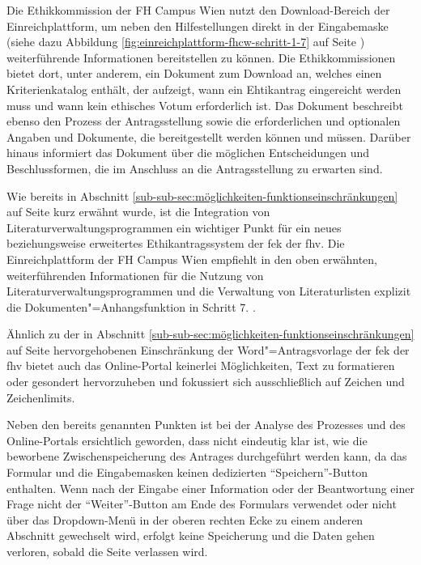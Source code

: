 \documentclass[a4paper,12pt,twoside]{scrreprt}
\begin{document}
Die Ethikkommission der FH Campus Wien nutzt den Download-Bereich der Einreichplattform, um neben den Hilfestellungen direkt in der Eingabemaske (siehe dazu Abbildung \ref{fig:einreichplattform-fhcw-schritt-1-7} auf Seite \pageref{fig:einreichplattform-fhcw-schritt-1-7}) weiterführende Informationen bereitstellen zu können. Die Ethikkommissionen bietet dort, unter anderem, ein Dokument zum Download an, welches einen Kriterienkatalog enthält, der aufzeigt, wann ein Ehtikantrag eingereicht werden muss und wann kein ethisches Votum erforderlich ist. Das Dokument beschreibt ebenso den Prozess der Antragsstellung sowie die erforderlichen und optionalen Angaben und Dokumente, die bereitgestellt werden können und müssen. Darüber hinaus informiert das Dokument über die möglichen Entscheidungen und Beschlussformen, die im Anschluss an die Antragsstellung zu erwarten sind. \cite[1\psqq]{ethikkommission_fh_campus_wien_wissenswertes_2022}

\medskip

Wie bereits in Abschnitt \ref{sub-sub-sec:möglichkeiten-funktionseinschränkungen} auf Seite \pageref{sub-sub-sec:möglichkeiten-funktionseinschränkungen} kurz erwähnt wurde, ist die Integration von Literaturverwaltungsprogrammen ein wichtiger Punkt für ein neues beziehungsweise erweitertes Ethikantragssystem der \acl{fek} der \acl{fhv}. Die Einreichplattform der FH Campus Wien empfiehlt in den oben erwähnten, weiterführenden Informationen für die Nutzung von Literaturverwaltungsprogrammen und die Verwaltung von Literaturlisten explizit die Dokumenten"=Anhangsfunktion in Schritt 7. \cite[5]{ethikkommission_fh_campus_wien_wissenswertes_2022}.

\medskip

Ähnlich zu der in Abschnitt \ref{sub-sub-sec:möglichkeiten-funktionseinschränkungen} auf Seite \pageref{sub-sub-sec:möglichkeiten-funktionseinschränkungen} hervorgehobenen Einschränkung der Word"=Antragsvorlage der \ac{fek} der \ac{fhv} bietet auch das Online-Portal keinerlei Möglichkeiten, Text zu formatieren oder gesondert hervorzuheben und fokussiert sich ausschließlich auf Zeichen und Zeichenlimits.

\medskip

Neben den bereits genannten Punkten ist bei der Analyse des Prozesses und des Online-Portals ersichtlich geworden, dass nicht eindeutig klar ist, wie die beworbene Zwischenspeicherung des Antrages durchgeführt werden kann, da das Formular und die Eingabemasken keinen dedizierten \enquote{Speichern}-Button enthalten. Wenn nach der Eingabe einer Information oder der Beantwortung einer Frage nicht der \enquote{Weiter}-Button am Ende des Formulars verwendet oder nicht über das Dropdown-Menü in der oberen rechten Ecke zu einem anderen Abschnitt gewechselt wird, erfolgt keine Speicherung und die Daten gehen verloren, sobald die Seite verlassen wird.
\end{document}
